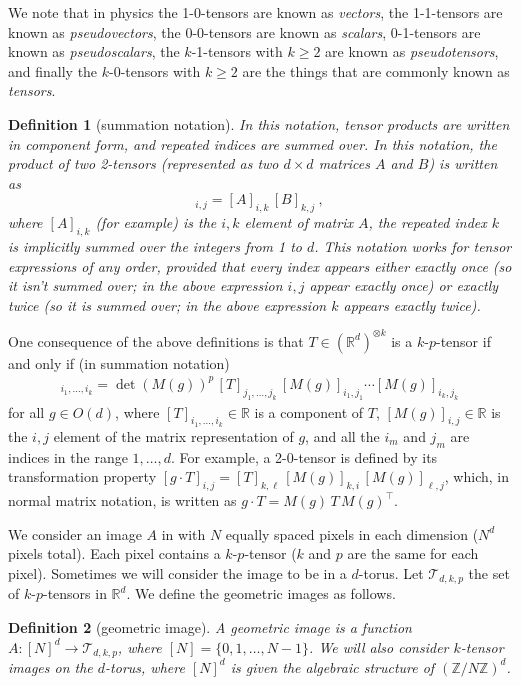 \documentclass{article}
\theoremstyle{plain}
\newtheorem{definition}{Definition}
\begin{document}
We note that in physics the 1-0-tensors are known as \emph{vectors}, the 1-1-tensors are known as \emph{pseudovectors}, the 0-0-tensors are known as \emph{scalars}, 0-1-tensors are known as \emph{pseudoscalars}, the $k$-1-tensors with $k\geq 2$ are known as \emph{pseudotensors}, and finally the $k$-0-tensors with $k\geq 2$ are the things that are commonly known as \emph{tensors}.

\begin{definition}[summation notation]
In this notation, tensor products are written in component form, and repeated indices are summed over.
In this notation, the product of two 2-tensors (represented as two $d\times d$ matrices $A$ and $B$) is written as
\begin{equation}
    [A\, B]_{i,j} = [A]_{i,k}\,[B]_{k,j} ~,
\end{equation}
where $[A]_{i,k}$ (for example) is the $i,k$ element of matrix $A$, the repeated index $k$ is implicitly summed over the integers from 1 to $d$.
This notation works for tensor expressions of any order, provided that every index appears either exactly once (so it isn't summed over; in the above expression $i, j$ appear exactly once) or exactly twice (so it is summed over; in the above expression $k$ appears exactly twice). 
\end{definition}

One consequence of the above definitions is that 
$T\in (\mathbb R^d)^{\otimes k}$ is a $k$-$p$-tensor if and only if (in summation notation)
\begin{align}
    [g\cdot T]_{i_1,\ldots, i_k} = \det(M(g))^p\, [T]_{j_1,\ldots,j_k}\,[M(g)]_{i_1,j_1}\cdots[M(g)]_{i_k,j_k}
\end{align} for all $g\in O(d)$, where $[T]_{i_1, \ldots ,i_k} \in \mathbb R$ is a component of $T$, $[M(g)]_{i,j}\in\mathbb R$ is the $i,j$ element of the matrix representation of $g$, and all the $i_m$ and $j_m$ are indices in the range $1,\ldots,d$.
For example, a 2-0-tensor is defined by its transformation property
$[g\cdot T]_{i,j} = [T]_{k,\ell}\,[M(g)]_{k,i}\,[M(g)]_{\ell,j}$,
which, in normal matrix notation, is written as
$g\cdot T = M(g)\,T\,M(g)^\top$.

We consider an image $A$ in with $N$ equally spaced pixels in each dimension ($N^d$ pixels total). Each pixel contains a $k$-$p$-tensor ($k$ and $p$ are the same for each pixel). Sometimes we will consider the image to be in a $d$-torus. 
Let $\mathcal T_{d,k,p}$ the set of $k$-$p$-tensors in $\mathbb R^d$. We define the geometric images as follows.
\begin{definition}[geometric image]
A geometric image is a function $A:[N]^d \to \mathcal T_{d,k,p}$, where $[N]=\{0,1,\ldots, N-1\}$. We will also consider $k$-tensor images on the $d$-torus, where $[N]^d$ is given the algebraic structure of $(\mathbb Z / N\mathbb Z)^d$.
\end{definition}
\end{document}
